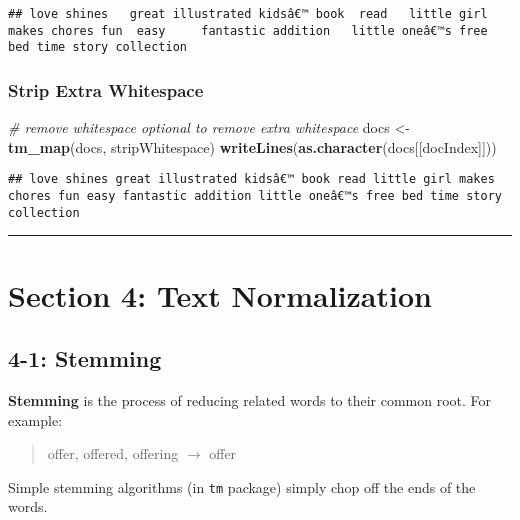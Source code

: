 \documentclass[
]{article}
\newenvironment{Shaded}{\begin{snugshade}}{\end{snugshade}}
\newcommand{\CommentTok}[1]{\textcolor[rgb]{0.56,0.35,0.01}{\textit{#1}}}
\newcommand{\KeywordTok}[1]{\textcolor[rgb]{0.13,0.29,0.53}{\textbf{#1}}}
\newcommand{\NormalTok}[1]{#1}
\newcommand{\StringTok}[1]{\textcolor[rgb]{0.31,0.60,0.02}{#1}}
\begin{document}
\begin{verbatim}
## love shines   great illustrated kidsâ€™ book  read   little girl makes chores fun  easy     fantastic addition   little oneâ€™s free bed time story collection
\end{verbatim}

\hypertarget{strip-extra-whitespace}{%
\subsubsection{Strip Extra Whitespace}\label{strip-extra-whitespace}}

\begin{Shaded}
\begin{Highlighting}[]
\CommentTok{# remove whitespace optional to remove extra whitespace}
\NormalTok{docs <-}\StringTok{ }\KeywordTok{tm_map}\NormalTok{(docs, stripWhitespace)}
\KeywordTok{writeLines}\NormalTok{(}\KeywordTok{as.character}\NormalTok{(docs[[docIndex]]))}
\end{Highlighting}
\end{Shaded}

\begin{verbatim}
## love shines great illustrated kidsâ€™ book read little girl makes chores fun easy fantastic addition little oneâ€™s free bed time story collection
\end{verbatim}

\begin{center}\rule{0.5\linewidth}{0.5pt}\end{center}

\hypertarget{section-4-text-normalization}{%
\section{Section 4: Text
Normalization}\label{section-4-text-normalization}}

\hypertarget{stemming}{%
\subsection{4-1: Stemming}\label{stemming}}

\textbf{Stemming} is the process of reducing related words to their
common root. For example:

\begin{quote}
offer, offered, offering \(\rightarrow\) offer
\end{quote}

Simple stemming algorithms (in \texttt{tm} package) simply chop off the
ends of the words.
\end{document}

